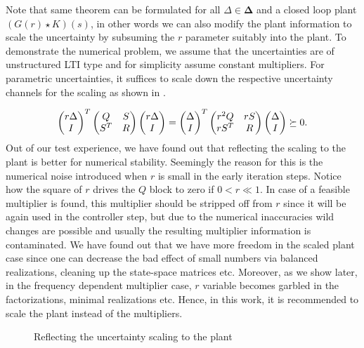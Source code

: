 \begin{rem}

Note that same theorem can be formulated for all $\Delta\in\bm{\Delta}$ and a closed loop plant $(G(r)\star K) (s)$,
in other words we can also modify the plant information to scale the uncertainty by subsuming the $r$ parameter suitably into the 
plant.
To demonstrate the numerical problem, we assume that the uncertainties are of unstructured LTI type and for simplicity assume 
constant multipliers. For parametric uncertainties, it suffices to scale down the respective uncertainty channels for the scaling 
as shown in . 

\[
\begin{pmatrix}r\Delta\\I\end{pmatrix}^T\begin{pmatrix}Q&S\\S^T&R\end{pmatrix}\begin{pmatrix}r\Delta\\I\end{pmatrix} = \begin{pmatrix}\Delta\\I\end{pmatrix}^T\begin{pmatrix}r^2 Q&rS\\rS^T&R\end{pmatrix}\begin{pmatrix}\Delta\\I\end{pmatrix}\succeq 0.
\]
Out of our test experience, we have found out that reflecting the scaling to the plant is better for numerical stability. Seemingly the 
reason for this is the numerical noise introduced when $r$ is small in the early iteration steps. Notice how the square of $r$ drives the 
$Q$ block to zero if $0<r\ll 1$. In case of a feasible multiplier is found, this multiplier should be stripped off from $r$ since it will 
be again used in the controller step, but due to the numerical inaccuracies wild changes are possible and usually the resulting multiplier 
information is contaminated. We have found out that we have more freedom in the scaled plant case since one can decrease the bad effect of 
small numbers via balanced realizations, cleaning up the state-space matrices etc. Moreover, as we show later, in the frequency dependent 
multiplier case, $r$ variable becomes garbled in the factorizations, minimal realizations etc. Hence, in this work, it is recommended to 
scale the plant instead of the multipliers.
\end{rem}

\begin{figure}%
\centering%
\caption{Reflecting the uncertainty scaling to the plant}%
\label{fig:uncscale}%
\end{figure}


